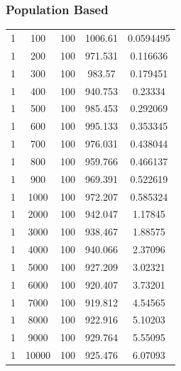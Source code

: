 \documentclass[10pt,letterpaper]{article}
\begin{document}
\subsubsection{Population Based}
\begin{tabular}{ c | c | c | c | c }
 1 & 100 & 100 & 1006.61 & 0.0594495 \\
 1 & 200 & 100 & 971.531 & 0.116636 \\
 1 & 300 & 100 & 983.57 & 0.179451 \\
 1 & 400 & 100 & 940.753 & 0.23334 \\
 1 & 500 & 100 & 985.453 & 0.292069 \\
 1 & 600 & 100 & 995.133 & 0.353345 \\
 1 & 700 & 100 & 976.031 & 0.438044 \\ 
 1 & 800 & 100 & 959.766 & 0.466137 \\   
 1 & 900 & 100 & 969.391 & 0.522619 \\
 1 & 1000 & 100 & 972.207 & 0.585324 \\
 1 & 2000 & 100 & 942.047 & 1.17845  \\
 1 & 3000 & 100 & 938.467 & 1.88575 \\
 1 & 4000 & 100 & 940.066 & 2.37096 \\
 1 & 5000 & 100 & 927.209 & 3.02321 \\
 1 & 6000 & 100 & 920.407 & 3.73201 \\
 1 & 7000 & 100 & 919.812 & 4.54565 \\
 1 & 8000 & 100 & 922.916 & 5.10203 \\
 1 & 9000 & 100 & 929.764 & 5.55095 \\
 1 & 10000 & 100 & 925.476 & 6.07093 \\
\end{tabular}
\end{document}
